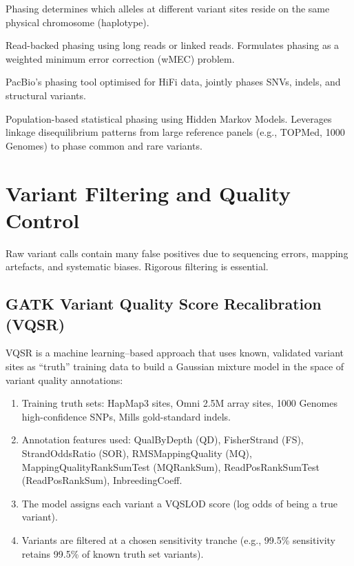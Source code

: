 Phasing determines which alleles at different variant sites reside on the same physical chromosome (haplotype).

\begin{description}[style=nextline]
  \item[WhatsHap] Read-backed phasing using long reads or linked reads. Formulates phasing as a weighted minimum error correction (wMEC) problem.
  \item[HiPhase] PacBio's phasing tool optimised for HiFi data, jointly phases SNVs, indels, and structural variants.
  \item[SHAPEIT5] Population-based statistical phasing using Hidden Markov Models. Leverages linkage disequilibrium patterns from large reference panels (e.g., TOPMed, 1000 Genomes) to phase common and rare variants.
\end{description}

\section{Variant Filtering and Quality Control}
\label{sec:variant_filter}

Raw variant calls contain many false positives due to sequencing errors, mapping artefacts, and systematic biases. Rigorous filtering is essential.

\subsection{GATK Variant Quality Score Recalibration (VQSR)}

VQSR is a machine learning--based approach that uses known, validated variant sites as ``truth'' training data to build a Gaussian mixture model in the space of variant quality annotations:

\begin{enumerate}[nosep]
  \item Training truth sets: HapMap3 sites, Omni 2.5M array sites, 1000 Genomes high-confidence SNPs, Mills gold-standard indels.
  \item Annotation features used: QualByDepth (QD), FisherStrand (FS), StrandOddsRatio (SOR), RMSMappingQuality (MQ), MappingQualityRankSumTest (MQRankSum), ReadPosRankSumTest (ReadPosRankSum), InbreedingCoeff.
  \item The model assigns each variant a VQSLOD score (log odds of being a true variant).
  \item Variants are filtered at a chosen sensitivity tranche (e.g., 99.5\% sensitivity retains 99.5\% of known truth set variants).
\end{enumerate}

